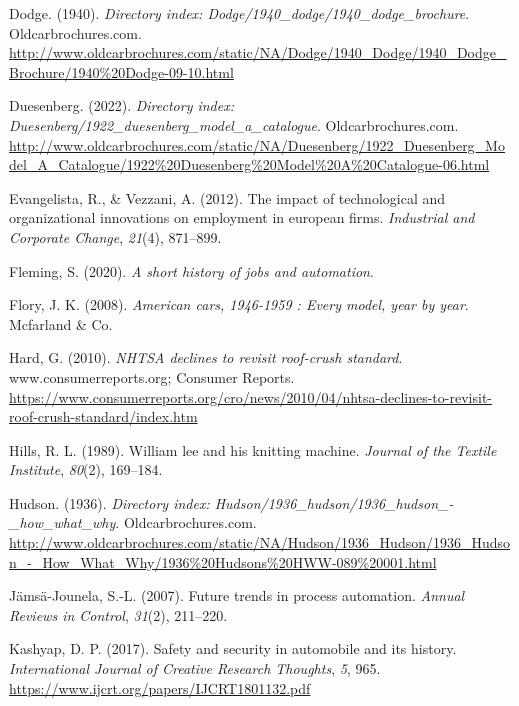 \documentclass[
  man,floatsintext]{apa7}
\newlength{\cslhangindent}
\newlength{\cslentryspacingunit} %
\newenvironment{CSLReferences}[2] %
 {%
  \setlength{\parindent}{0pt}
  \ifodd #1
  \let\oldpar\par
  \def\par{\hangindent=\cslhangindent\oldpar}
  \fi
  \setlength{\parskip}{#2\cslentryspacingunit}
 }%
 {}
\begin{document}
\begin{CSLReferences}{1}{0}
\leavevmode{}%
Dodge. (1940). \emph{Directory index: Dodge/1940\_dodge/1940\_dodge\_brochure}. Oldcarbrochures.com. \url{http://www.oldcarbrochures.com/static/NA/Dodge/1940_Dodge/1940_Dodge_Brochure/1940\%20Dodge-09-10.html}

\leavevmode{}%
Duesenberg. (2022). \emph{Directory index: Duesenberg/1922\_duesenberg\_model\_a\_catalogue}. Oldcarbrochures.com. \url{http://www.oldcarbrochures.com/static/NA/Duesenberg/1922_Duesenberg_Model_A_Catalogue/1922\%20Duesenberg\%20Model\%20A\%20Catalogue-06.html}

\leavevmode{}%
Evangelista, R., \& Vezzani, A. (2012). The impact of technological and organizational innovations on employment in european firms. \emph{Industrial and Corporate Change}, \emph{21}(4), 871--899.

\leavevmode{}%
Fleming, S. (2020). \emph{A short history of jobs and automation}.

\leavevmode{}%
Flory, J. K. (2008). \emph{American cars, 1946-1959 : Every model, year by year}. Mcfarland \& Co.

\leavevmode{}%
Hard, G. (2010). \emph{NHTSA declines to revisit roof-crush standard}. www.consumerreports.org; Consumer Reports. \url{https://www.consumerreports.org/cro/news/2010/04/nhtsa-declines-to-revisit-roof-crush-standard/index.htm}

\leavevmode{}%
Hills, R. L. (1989). William lee and his knitting machine. \emph{Journal of the Textile Institute}, \emph{80}(2), 169--184.

\leavevmode{}%
Hudson. (1936). \emph{Directory index: Hudson/1936\_hudson/1936\_hudson\_-\_how\_what\_why}. Oldcarbrochures.com. \url{http://www.oldcarbrochures.com/static/NA/Hudson/1936_Hudson/1936_Hudson_-_How_What_Why/1936\%20Hudsons\%20HWW-089\%20001.html}

\leavevmode{}%
Jämsä-Jounela, S.-L. (2007). Future trends in process automation. \emph{Annual Reviews in Control}, \emph{31}(2), 211--220.

\leavevmode{}%
Kashyap, D. P. (2017). Safety and security in automobile and its history. \emph{International Journal of Creative Research Thoughts}, \emph{5}, 965. \url{https://www.ijcrt.org/papers/IJCRT1801132.pdf}


\end{CSLReferences}
\end{document}
